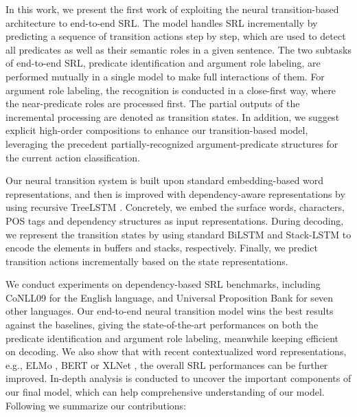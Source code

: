 \documentclass[letterpaper]{article} %
\begin{document}
\begin{CJK}{UTF8}{gbsn}
In this work, we present the first work of exploiting the neural transition-based architecture to end-to-end SRL.
The model handles SRL incrementally by predicting a sequence of transition actions step by step,
which are used to detect all predicates as well as their semantic roles in a given sentence.
The two subtasks of end-to-end SRL, predicate identification and argument role labeling, are performed mutually in a single model to make full interactions of them.
For argument role labeling, the recognition is conducted in a close-first way,
where the near-predicate roles are processed first.
The partial outputs of the incremental processing are denoted as transition states.
In addition, we suggest explicit high-order compositions to enhance our transition-based model,
leveraging the precedent partially-recognized argument-predicate structures for the current action classification.






Our neural transition system is built upon standard embedding-based word representations,
and then is improved with dependency-aware representations by using recursive TreeLSTM \cite{tai-etal-2015-improved}.
Concretely, we embed the surface words, characters, POS tags and dependency structures as input representations.
During decoding, we represent the transition states by using standard BiLSTM \cite{hochreiter1997long} and Stack-LSTM \cite{dyer-etal-2015-transition} to encode the elements in buffers and stacks, respectively.
Finally, we predict transition actions incrementally based on the state representations.



We conduct experiments on dependency-based SRL benchmarks, including CoNLL09 \cite{hajic-etal-2009-conll} for the English language, and Universal Proposition Bank \cite{akbik2015generating,akbik2016polyglot} for seven other languages.
Our end-to-end neural transition model wins the best results against the baselines, giving the state-of-the-art performances on both the predicate identification and argument role labeling, meanwhile keeping efficient on decoding.
We also show that with recent contextualized word representations, e.g., ELMo \cite{devlin-etal-2019-bert}, BERT \cite{PetersNIGCLZ18} or XLNet \cite{YangDYCSL19},
the overall SRL performances can be further improved.
In-depth analysis is conducted to uncover the important components of our final model,
which can help comprehensive understanding of our model.
Following we summarize our contributions:


\end{CJK}
\end{document}
